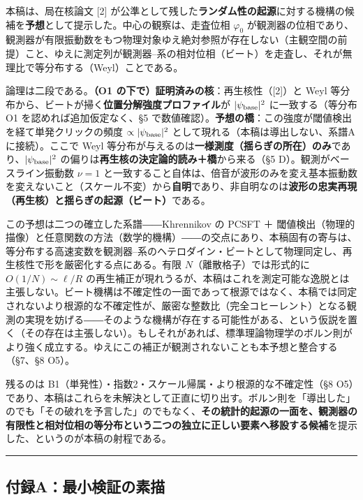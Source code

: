 \documentclass[
]{ltjsarticle}
\begin{document}
本稿は、局在核論文 {[}2{]}
が公準として残した\textbf{ランダム性の起源}に対する機構の候補を\textbf{予想}として提示した。中心の観察は、走査位相
\(\varphi_0\)
が観測器の位相であり、観測器が有限振動数をもつ物理対象ゆえ絶対参照が存在しない（主観空間の前提）こと、ゆえに測定列が観測器--系の相対位相（ビート）を走査し、それが無理比で等分布する（Weyl）ことである。

論理は二段である。\textbf{（O1
の下で）証明済みの核}：再生核性（{[}2{]}）と Weyl
等分布から、ビートが掃く\textbf{位置分解強度プロファイル}が
\(|\psi_{\rm base}|^2\) に一致する（等分布 O1 を認めれば追加仮定なく、§5
で数値確認）。\textbf{予想の橋}：この強度が閾値検出を経て単発クリックの頻度
\(\propto|\psi_{\rm base}|^2\)
として現れる（本稿は導出しない、系譜Aに接続）。ここで Weyl
等分布が与えるのは\textbf{一様測度（揺らぎの所在）のみ}であり、\(|\psi_{\rm base}|^2\)
の偏りは\textbf{再生核の決定論的読み＋橋}から来る（§5
D）。観測がベースライン振動数 \(\nu=1\)
と一致すること自体は、倍音が波形のみを変え基本振動数を変えないこと（スケール不変）から\textbf{自明}であり、非自明なのは\textbf{波形の忠実再現（再生核）と揺らぎの起源（ビート）}である。

この予想は二つの確立した系譜――Khrennikov の PCSFT ＋
閾値検出（物理的描像）と任意関数の方法（数学的機構）――の交点にあり、本稿固有の寄与は、等分布する高速変数を観測器--系のヘテロダイン・ビートとして物理同定し、再生核性で形を厳密化する点にある。有限
\(N\)（離散格子）では形式的に \(O(1/N)\sim\ell/R\)
の再生補正が現れうるが、本稿はこれを測定可能な逸脱とは主張しない。ビート機構は不確定性の一面であって根源ではなく、本稿では同定されないより根源的な不確定性が、厳密な整数比（完全コヒーレント）となる観測の実現を妨げる――そのような機構が存在する可能性がある、という仮説を置く（その存在は主張しない）。もしそれがあれば、標準理論物理学のボルン則がより強く成立する。ゆえにこの補正が観測されないことも本予想と整合する（§7、§8
O5）。

残るのは B1（単発性）・指数2・スケール帰属・より根源的な不確定性（§8
O5）であり、本稿はこれらを未解決として正直に切り出す。ボルン則を「導出した」のでも「その破れを予言した」のでもなく、\textbf{その統計的起源の一面を、観測器の有限性と相対位相の等分布という二つの独立に正しい要素へ移設する候補}を提示した、というのが本稿の射程である。

\begin{center}\rule{0.5\linewidth}{0.5pt}\end{center}

\subsection{付録A：最小検証の素描}\label{ux4ed8ux9332aux6700ux5c0fux691cux8a3cux306eux7d20ux63cf}
\end{document}
